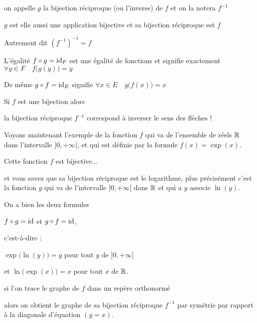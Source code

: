 on appelle $g$ la bijection réciproque (ou l'inverse) de $f$ et on la notera $f^{-1}$

\change

$g$ est elle aussi une application bijective et sa bijection réciproque est $f$

Autrement dit $\left( f^{-1} \right)^{-1} = f$

\change

L'égalité $f \circ g = \mathop{\text{id}}\nolimits_F$ est une égalité de fonctions et signifie exactement
 $\forall y \in F  \quad f\big(g(y)\big) = y$

\change

De même 
$g \circ f = \mathop{\text{id}}\nolimits_E$ signifie  $\forall x \in E \quad g\big(f(x)\big) = x$


\diapo

Si $f$ est une bijection alors 

\change

la bijection réciproque $f^{-1}$ correspond à inverser le sens des flèches !


\change

Voyons maintenant l'exemple de la fonction $f$ qui va de l'ensemble de réels $\mathbb{R}$
dans l'intervalle $]0,+\infty[$, et qui est définie par la formule $f(x)=\exp(x)$.

Cette fonction $f$ est bijective...

\change

et vous savez que sa bijection réciproque est
le logarithme, plus précisément c'est la fonction $g$
qui va de l'intervalle $]0,+\infty[$ dans $\mathbb{R}$ et qui a $y$ associe $\ln(y)$.

\change

On a bien les deux formules 

$f \circ g= \mathop{\text{id}}\nolimits$ et $g\circ f = \mathop{\text{id}}\nolimits$,

c'est-à-dire :

$\exp\big(\ln(y) \big) = y$ pour tout $y$ de $]0,+\infty[$


et $\ln\big(\exp(x)\big) = x$ pour tout $x$ de $\mathbb{R}$.

\change

si l'on trace le graphe de $f$ dans un repère orthonormé

\change

alors on obtient le graphe de sa bijection réciproque $f^{-1}$
par symétrie par rapport à la diagonale d'équation $(y=x)$.




\diapo


